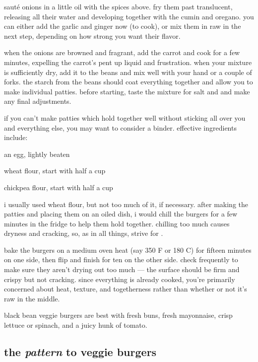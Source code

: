 saut\'{e} onions in a little oil with the spices above. fry them past 
translucent, releasing all their water and developing together with the cumin 
and oregano. you can either add the garlic and ginger now (to cook), or mix 
them in raw in the next step, depending on how strong you want their flavor.

when the onions are browned and fragrant, add the carrot and cook for a few 
minutes, expelling the carrot's pent up liquid and frustration. when your 
mixture is sufficiently dry, add it to the beans and mix well with your hand 
or a couple of forks. the starch from the beans should coat everything 
together and allow you to make individual patties. before starting, taste the 
mixture for salt and  and make any final adjustments.

if you can't make patties which hold together well without sticking all over 
you and everything else, you may want to consider a binder. effective 
ingredients include:

\begin{ingredients}
  \item an egg, lightly beaten
  \item wheat flour, start with half a cup
  \item chickpea flour, start with half a cup
\end{ingredients}

i usually used wheat flour, but not too much of it, if necessary. after making 
the patties and placing them on an oiled dish, i would chill the burgers for a 
few minutes in the fridge to help them hold together. chilling too much causes 
dryness and cracking, so, as in all things, strive for .

bake the burgers on a medium oven heat (say 350 F or 180 C) for fifteen 
minutes on one side, then flip and finish for ten on the other side. check 
frequently to make sure they aren't drying out too much --- the surface should 
be firm and crispy but not cracking. since everything is already cooked, 
you're primarily concerned about heat, texture, and togetherness rather than 
whether or not it's raw in the middle.

black bean veggie burgers are best with fresh buns, fresh mayonnaise, crisp 
lettuce or spinach, and a juicy hunk of tomato.

\subsection{the \textit{pattern} to veggie burgers}

